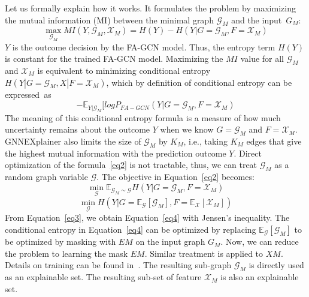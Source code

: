 Let us formally explain how it works. It
formulates the problem by maximizing the mutual information (MI)
between the minimal graph $\mathcal{G}_M$ and the input~$G_M$:
\begin{equation}\label{maineq}
\max_{\mathcal{G}_M} MI(Y,\mathcal{G}_M, \mathcal{X}_M) = H(Y) - H(Y|G=\mathcal{G}_M, F=\mathcal{X}_M)
\end{equation}
$Y$ is the outcome decision by the FA-GCN model. Thus, the entropy term
$H(Y)$ is constant for the trained FA-GCN model. Maximizing the $MI$
value for all $\mathcal{G}_M$ and $\mathcal{X}_M$ is equivalent to minimizing conditional
entropy $H(Y|G=\mathcal{G}_M, X|F=\mathcal{X}_M)$, which by definition of
conditional entropy can be expressed~as
\begin{equation}
  \label{eq2}
-\mathbb{E}_{Y|\mathcal{G}_M}
  [log P_{FA-GCN} (Y|G=\mathcal{G}_M,F=\mathcal{X}_M)
  \end{equation}
The meaning of this conditional entropy formula is a measure of how
much uncertainty remains about the outcome $Y$ when we know
$G=\mathcal{G}_M$ and $F=\mathcal{X}_M$. GNNEXplainer also limits the
size of $\mathcal{G}_M$ by $K_M$, i.e., taking $K_M$ edges that give
the highest mutual information with the prediction outcome $Y$.
%
Direct optimization of the formula~\ref{eq2} is not tractable, thus,
we can treat $\mathcal{G}_M$ as a random graph variable
$\mathcal{G}$. The objective in Equation~\ref{eq2} becomes:
\begin{equation}
  \label{eq3}
  \min_{\mathcal{G}} \mathbb{E}_{\mathcal{G}_M \sim \mathcal{G}} H(Y|G=\mathcal{G}_M,F=\mathcal{X}_M)
\end{equation}
\begin{equation}
  \label{eq4}
  \min_{\mathcal{G}} H(Y| G=\mathbb{E}_{\mathcal{G}}[\mathcal{G}_M], F = \mathbb{E}_{\mathcal{X}}[\mathcal{X}_M])
\end{equation}
From Equation~\ref{eq3}, we obtain Equation~\ref{eq4} with Jensen's
inequality.  The conditional entropy in Equation~\ref{eq4} can be
optimized by replacing $\mathbb{E}_{\mathcal{G}}[\mathcal{G}_M]$ to be
optimized by masking with $EM$ on the input graph $G_M$.
Now, we can reduce the problem to learning the mask $EM$.
Similar treatment is applied to $XM$.
Details on training can be found in~\cite{GNNExplainer}. The resulting
sub-graph $\mathcal{G}_M$ is directly used as an explainable set. The resulting sub-set of feature $\mathcal{X}_M$ is also an explainable set.


